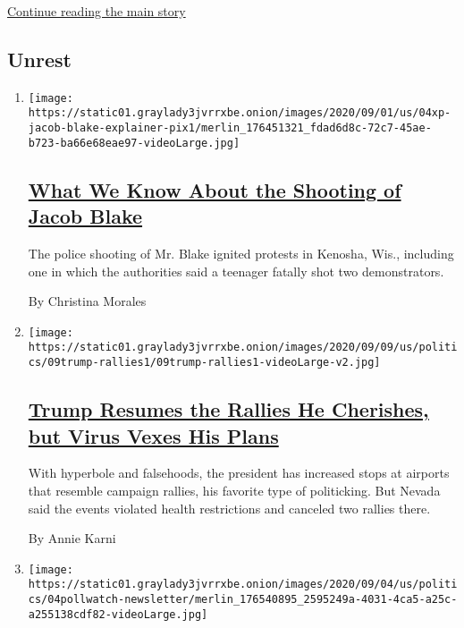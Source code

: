 \protect\hyperlink{after-mid2}{Continue reading the main story}

\hypertarget{unrest}{%
\subsection{Unrest}\label{unrest}}

\begin{enumerate}
\def\labelenumi{\arabic{enumi}.}
\item
  \texttt{[image: https://static01.graylady3jvrrxbe.onion/images/2020/09/01/us/04xp-jacob-blake-explainer-pix1/merlin\_176451321\_fdad6d8c-72c7-45ae-b723-ba66e68eae97-videoLarge.jpg]}

  \hypertarget{what-we-know-about-the-shooting-of-jacob-blake}{%
  \subsection{\texorpdfstring{\href{/article/jacob-blake-shooting-kenosha.html}{What
  We Know About the Shooting of Jacob
  Blake}}{What We Know About the Shooting of Jacob Blake}}\label{what-we-know-about-the-shooting-of-jacob-blake}}

  The police shooting of Mr. Blake ignited protests in Kenosha, Wis.,
  including one in which the authorities said a teenager fatally shot
  two demonstrators.

  By Christina Morales
\item
  \texttt{[image: https://static01.graylady3jvrrxbe.onion/images/2020/09/09/us/politics/09trump-rallies1/09trump-rallies1-videoLarge-v2.jpg]}

  \hypertarget{trump-resumes-the-rallies-he-cherishes-but-virus-vexes-his-plans}{%
  \subsection{\texorpdfstring{\href{/2020/09/09/us/politics/trump-rally-nevada.html}{Trump
  Resumes the Rallies He Cherishes, but Virus Vexes His
  Plans}}{Trump Resumes the Rallies He Cherishes, but Virus Vexes His Plans}}\label{trump-resumes-the-rallies-he-cherishes-but-virus-vexes-his-plans}}

  With hyperbole and falsehoods, the president has increased stops at
  airports that resemble campaign rallies, his favorite type of
  politicking. But Nevada said the events violated health restrictions
  and canceled two rallies there.

  By Annie Karni
\item
  \texttt{[image: https://static01.graylady3jvrrxbe.onion/images/2020/09/04/us/politics/04pollwatch-newsletter/merlin\_176540895\_2595249a-4031-4ca5-a25c-a255138cdf82-videoLarge.jpg]}


\end{enumerate}
